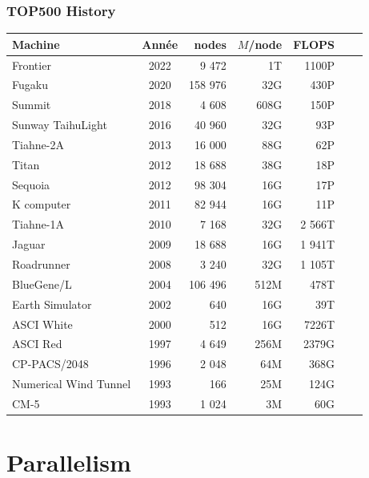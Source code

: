 \documentclass[xcolor={x11names,svgnames,psnames}]{beamer}
\begin{document}

\begin{frame}
  \frametitle{TOP500 History}

  \small
  \begin{tabular}{|l||c|r|r|r|r|r|}
  \hline
  Machine             & Année & nodes   & $M$/node & FLOPS \\
  \hline\hline
Frontier              & 2022 &   9 472  & 1T       &  1100P  \\
Fugaku                & 2020 & 158 976	& 32G	   &   430P  \\
Summit                & 2018 &   4 608	& 608G	   &   150P  \\
Sunway TaihuLight     & 2016 &  40 960	& 32G	   &    93P  \\
Tiahne-2A             & 2013 &  16 000	& 88G	   &    62P  \\
Titan                 & 2012 &  18 688	& 38G	   &    18P  \\
Sequoia	              & 2012 &  98 304	& 16G	   &    17P  \\
K computer            & 2011 &  82 944	& 16G	   &    11P  \\
Tiahne-1A             & 2010 &   7 168	& 32G	   & 2 566T  \\
Jaguar                & 2009 &  18 688	& 16G	   & 1 941T  \\
Roadrunner            & 2008 &   3 240	& 32G	   & 1 105T  \\
BlueGene/L            & 2004 & 106 496	& 512M	   &   478T  \\
Earth Simulator       &	2002 &     640	& 16G	   &    39T  \\
ASCI White            &	2000 &     512	& 16G	   &  7226T  \\
ASCI Red              &	1997 &   4 649	& 256M	   &  2379G  \\
CP-PACS/2048          &	1996 &   2 048	& 64M	   &   368G  \\
Numerical Wind Tunnel &	1993 &     166	& 25M	   &   124G  \\
CM-5                  &	1993 &   1 024	& 3M	   &    60G  \\
\hline
\end{tabular}

\end{frame}



\section{Parallelism}
\end{document}
